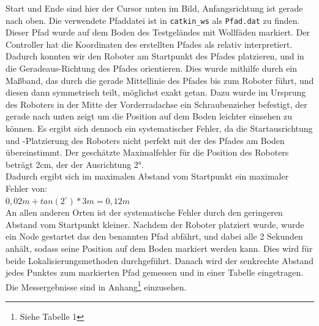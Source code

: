 \documentclass[11pt,a4paper]{article}
\begin{document}
Start und Ende sind hier der Cursor unten im Bild, Anfangsrichtung ist gerade nach oben. Die verwendete Pfaddatei ist in \verb+catkin_ws+ als 
\verb+Pfad.dat+ zu finden.
Dieser Pfad wurde auf dem Boden des Testgeländes mit Wollfäden markiert. Der Controller hat die Koordinaten des erstellten Pfades 
als relativ interpretiert. Dadurch konnten wir den Roboter am Startpunkt des Pfades platzieren, und in die Geradeaus-Richtung des Pfades orientieren. 
Dies wurde mithilfe durch ein Maßband, das durch die gerade Mittellinie des Pfades bis zum Roboter führt, und diesen dann symmetrisch teilt, möglichst exakt getan. 
Dazu wurde im Ursprung des Roboters in der Mitte der Vorderradachse ein Schraubenzieher befestigt, der gerade nach unten zeigt um die Position auf dem 
Boden leichter einsehen zu können. Es ergibt sich dennoch ein systematischer Fehler, da die Startausrichtung und -Platzierung des Roboters nicht perfekt 
mit der des Pfades am Boden übereinstimmt. Der geschätzte Maximalfehler für die Position des Roboters beträgt 2cm, der der Ausrichtung 2°. 
\\Dadurch ergibt sich im maximalen Abstand vom Startpunkt ein maximaler Fehler von: \\
$
0,02m + tan(2^\circ) * 3m = 0,12m
$                                                          \\ 
An allen anderen Orten ist der systematische Fehler durch den geringeren Abstand vom Startpunkt kleiner.
Nachdem der Roboter platziert wurde, wurde ein Node gestartet das den benannten Pfad abfährt, und dabei alle 2 Sekunden anhält, sodass seine Position 
auf dem Boden markiert werden kann. Dies wird für beide Lokalisierungsmethoden durchgeführt. Danach wird der senkrechte Abstand jedes Punktes 
zum markierten Pfad gemessen und in einer Tabelle eingetragen. Die Messergebnisse sind in Anhang\footnote{Siehe Tabelle 1} einzusehen.
\end{document}
